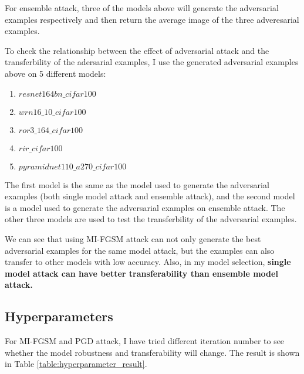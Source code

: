 \documentclass{article}
\begin{document}
For ensemble attack, three of the models above will generate the adversarial examples respectively and then return the average image of the three adveresarial examples.

To check the relationship between the effect of adversarial attack and the transferbility of the adersarial examples, 
I use the generated adversarial examples above on 5 different models:

\begin{enumerate}
  \item $resnet164bn\_cifar100$
  \item $wrn16\_10\_cifar100$
  \item $ror3\_164\_cifar100$
  \item $rir\_cifar100$
  \item $pyramidnet110\_a270\_cifar100$
\end{enumerate}

The first model is the same as the model used to generate the adversarial examples (both single model attack and ensemble attack),
and the second model is a model used to generate the adversarial examples on ensemble attack.
The other three models are used to test the transferbility of the adversarial examples.

We can see that using MI-FGSM attack can not only generate the best adversarial examples for the same model attack,
but the examples can also transfer to other models with low accuracy.
Also, in my model selection, \textbf{single model attack can have better transferability than ensemble model attack.}

\subsection{Hyperparameters}

For MI-FGSM and PGD attack, I have tried different iteration number to see whether the model robustness and transferability will change.
The result is shown in Table \ref{table:hyperparameter_result}.
\end{document}
